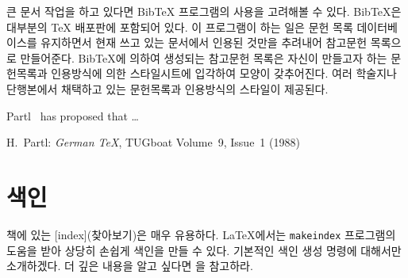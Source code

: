 큰 문서 작업을 하고 있다면 Bib\TeX{} 프로그램의 사용을 고려해볼 수 있다.
Bib\TeX 은 대부분의 \TeX{} 배포판에 포함되어 있다. 이 프로그램이 하는 일은 
문헌 목록 데이터베이스를 유지하면서 현재 쓰고 있는 문서에서 인용된 것만을 추려내어 
참고문헌 목록으로 만들어준다.
Bib\TeX 에 의하여 생성되는 참고문헌 목록은 자신이 만들고자 하는 문헌목록과 
인용방식에 의한 스타일시트에 입각하여 모양이 갖추어진다. 여러 학술지나 단행본에서 
채택하고 있는 문헌목록과 인용방식의 스타일이 제공된다.

{
\renewcommand\bibname{Bibliography}
\begin{example}
Partl~\cite{pa} has
proposed that \ldots
\begin{thebibliography}{99}
 H.~Partl:
\emph{German \TeX},
TUGboat Volume~9, Issue~1 (1988)
\end{thebibliography}
\end{example}
}

\section{색인}
\label{sec:indexing}

책에 있는 [index](찾아보기)은 매우 유용하다. \LaTeX 에서는 \texttt{makeindex} 프로그램의 도움을 받아 상당히 손쉽게 색인을 만들 수 있다.
기본적인 색인 생성 명령에 대해서만 소개하겠다. 더 깊은 내용을 알고 싶다면 \companion 을 참고하라.

